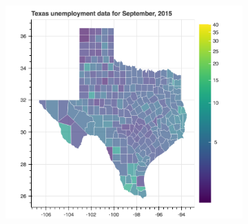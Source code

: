 \documentclass[11pt,letterpaper]{article}
\begin{document}
\begin{figure}
~
\begin{subfigure}{0.3\textwidth}
\includegraphics[width=1.2\linewidth]{tx_unemp_2015}
\end{subfigure}


\end{figure}
\end{document}
